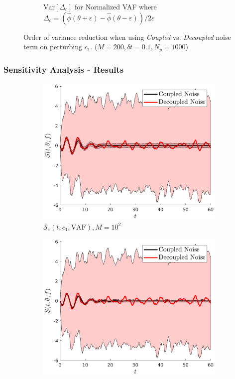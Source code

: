 \documentclass[a4paper,10pt]{beamer}
\newcommand{\sqb}[1]{\left[ #1 \right]}
\newcommand{\rb}[1]{\left( #1 \right)}
\begin{document}
\begin{frame}
\begin{figure}[H]
\begin{subfigure}[b]{0.48\linewidth}
				\caption{\scriptsize $\text{Var}\sqb{\Delta_{c}}$ for Normalized VAF where $\Delta_{c} = \rb{\hat{\phi}\rb{\theta+\varepsilon} - \hat{\phi}\rb{\theta-\varepsilon}}/2\varepsilon$}
			\end{subfigure}
		\caption{Order of variance reduction when using \textit{Coupled} vs. \textit{Decoupled} noise term on perturbing $c_{1}$. ($M=200,\delta t = 0.1,N_{p} = 1000$) }
		\end{figure}
	\end{frame}

	\begin{frame}
		\frametitle{Sensitivity Analysis - Results}
		\begin{figure}[H]
			\centering
			\begin{subfigure}{0.32\linewidth}
				\includegraphics[width=\linewidth]{./Plots/sensitivityAnalysis/c1M100.eps}
				\caption{\tiny $\mathcal{S}_{\varepsilon} \rb{t,c_{1};\text{VAF}}, M = 10^{2}$}
			\end{subfigure}
			\begin{subfigure}{0.32\linewidth}
				\includegraphics[width=\linewidth]{./Plots/sensitivityAnalysis/c3M100.eps}

\end{subfigure}
\end{figure}
\end{frame}
\end{document}
